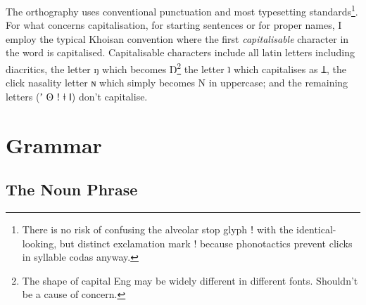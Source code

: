 \documentclass[11pt,a5paper]{book}
\newcommand{\qcn}[1]{\textcolor{AccentText}{\large#1}}
\begin{document}
The orthography uses conventional punctuation and most typesetting standards\footnote{There is no risk of confusing the alveolar stop glyph ǃ with the identical-looking, but distinct exclamation mark ! because phonotactics prevent clicks in syllable codas anyway.}. For what concerns capitalisation, for starting sentences or for proper names, I employ the typical Khoisan convention where the first \emph{capitalisable} character in the word is capitalised. Capitalisable characters include all latin letters including diacritics, the letter ŋ which becomes Ŋ\footnote{The shape of capital Eng may be widely different in different fonts. Shouldn't be a cause of concern.} the letter \qcn{ʇ} which capitalises as \qcn{Ʇ}, the click nasality letter \qcn{ɴ} which simply becomes \qcn{N} in uppercase; and the remaining letters (\qcn{ʼ ʘ ǃ ǂ ǁ}) don't capitalise. 

%

\chapter{Grammar}

\section{The Noun Phrase}
\end{document}
